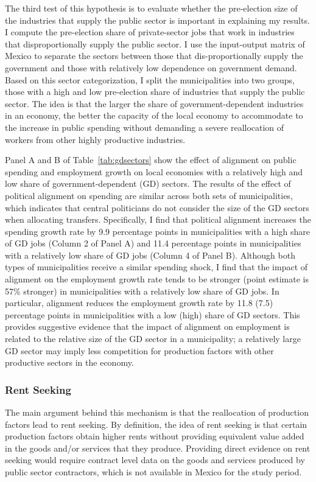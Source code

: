 \documentclass[dv_diss_main.tex]{subfiles}
\begin{document}
The third test of this hypothesis is to evaluate whether the pre-election size of the industries that supply the public sector is important in explaining my results. I compute the pre-election share of private-sector jobs that work in industries that disproportionally supply the public sector. I use the input-output matrix of Mexico to separate the sectors between those that dis-proportionally supply the government and those with relatively low dependence on government demand. Based on this sector categorization, I split the municipalities into two groups, those with a high and low pre-election share of industries that supply the public sector. The idea is that the larger the share of government-dependent industries in an economy, the better the capacity of the local economy to accommodate to the increase in public spending without demanding a severe reallocation of workers from other highly productive industries. 

Panel A and B of Table~\ref{tab:gdsectors} show the effect of alignment on public spending and employment growth on local economies with a relatively high and low share of government-dependent (GD) sectors. The results of the effect of political alignment on spending are similar across both sets of municipalities, which indicates that central politicians do not consider the size of the GD sectors when allocating transfers. Specifically, I find that political alignment increases the spending growth rate by 9.9 percentage points in municipalities with a high share of GD jobs (Column 2 of Panel A) and 11.4 percentage points in municipalities with a relatively low share of GD jobs  (Column 4 of Panel B). Although both types of municipalities receive a similar spending shock, I find that the impact of alignment on the employment growth rate tends to be stronger (point estimate is 57\% stronger) in municipalities with a relatively low share of GD jobs. In particular, alignment reduces the employment growth rate by 11.8 (7.5) percentage points in municipalities with a low (high) share of GD sectors.  This provides suggestive evidence that the impact of alignment on employment is related to the relative size of the GD sector in a municipality; a relatively large GD sector may imply less competition for production factors with other productive sectors in the economy. 










\subsubsection{Rent Seeking} The main argument behind this mechanism is that the reallocation of production factors lead to rent seeking. By definition, the idea of rent seeking is that certain production factors obtain higher rents without providing equivalent value added in the goods and/or services that they produce. Providing direct evidence on rent seeking would require contract level data on the goods and services produced by public sector contractors, which is not available in Mexico for the study period.
\end{document}
